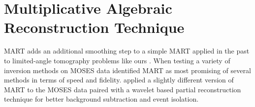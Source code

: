 \appendix
\section{Multiplicative Algebraic Reconstruction Technique}\label{MART}
	MART adds an additional smoothing step to a simple MART applied in the past to limited-angle tomography problems like ours \citep{Okamoto1991,Verhoeven1993}.
	When testing a variety of inversion methods on MOSES data \citet{FoxPhD} identified MART as most promising of several methods in terms of speed and fidelity.
	\citet{RustPhD} applied a slightly different version of MART to the MOSES data paired with a wavelet based partial reconstruction technique for better background subtraction and event isolation.
	
